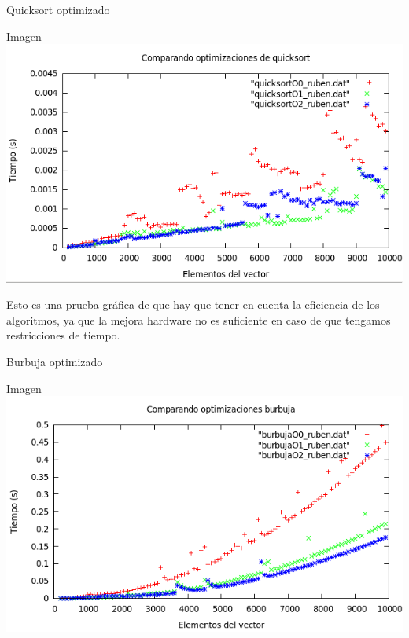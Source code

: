 \documentclass[compress]{beamer}
\begin{document}
\begin{frame}{Quicksort optimizado}
	\begin{alertblock}{Imagen}
	\includegraphics[scale=0.55]{../Graficas/Quicksort/quicksort_optimizacion.png}				\end{alertblock}
\end{frame}



\begin{frame}
	\begin{alertblock}
	Esto es una prueba gráfica de que hay que tener en cuenta la eficiencia de los 				algoritmos, ya que la mejora hardware no es suficiente en caso de que tengamos 				restricciones de tiempo.
	\end{alertblock}
\end{frame}

\begin{frame}{Burbuja optimizado}
	\begin{alertblock}{Imagen}
	\includegraphics[scale=0.55]{../Graficas/Burbuja/burbuja_optimizacion.png}
	\end{alertblock}
\end{frame}
\end{document}
